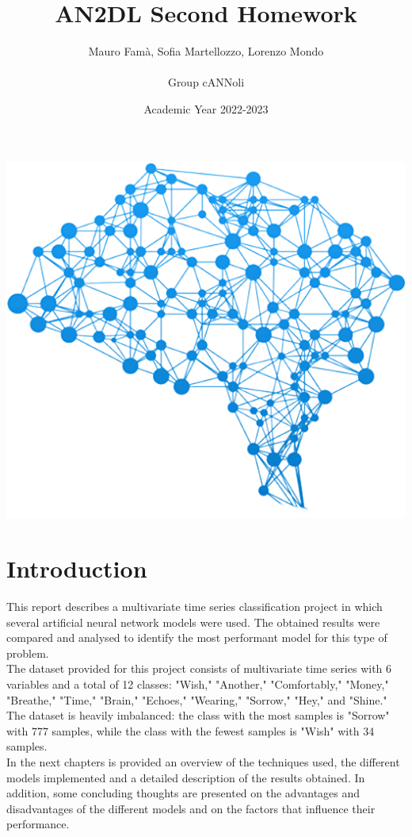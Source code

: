 \documentclass[11pt, oneside]{article}
\title{{\arial AN2DL Second Homework}}
\author{{\calibri Mauro Famà,   Sofia Martellozzo,   Lorenzo Mondo\\ \\
        Group cANNoli}}
\date{Academic Year 2022-2023}
\begin{document}
\maketitle
\begin{center}
    \includegraphics[scale=0.43]{images/title.png}
\end{center}
\newpage
\vspace{.25in}


\section{Introduction}
This report describes a multivariate time series classification project in which several artificial neural network models were used. The obtained results were compared and analysed to identify the most performant model for this type of problem.\\The dataset provided for this project consists of multivariate time series with 6 variables and a total of 12 classes: "Wish," "Another," "Comfortably," "Money," "Breathe," "Time," "Brain," "Echoes," "Wearing," "Sorrow," "Hey," and "Shine." The dataset is heavily imbalanced: the class with the most samples is "Sorrow" with 777 samples, while the class with the fewest samples is "Wish" with 34 samples.\\In the next chapters is provided an overview of the techniques used, the different models implemented and a detailed description of the results obtained. In addition, some concluding thoughts are presented on the advantages and disadvantages of the different models and on the factors that influence their performance.
\end{document}
